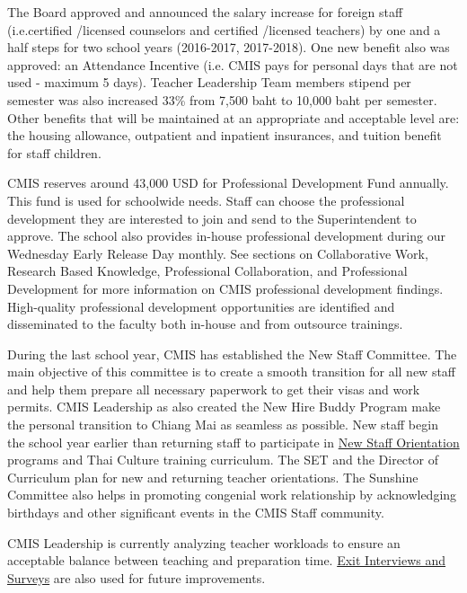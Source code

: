 \begin{findings}
The Board approved and announced the salary increase for foreign staff (i.e.certified /licensed counselors and certified /licensed teachers) by one and a half steps for two school years (2016-2017, 2017-2018). One new benefit also was approved: an Attendance Incentive (i.e. CMIS pays for personal days that are not used - maximum 5 days). Teacher Leadership Team members stipend per semester was also increased 33\% from 7,500 baht to  10,000 baht per semester. Other benefits that will be maintained at an appropriate and acceptable level are: the housing allowance, outpatient and inpatient insurances, and tuition benefit for staff children.


CMIS reserves around 43,000 USD for Professional Development Fund annually. This fund is used for schoolwide needs. Staff can choose the professional development they are interested to join and send to the Superintendent to approve. The school also provides in-house professional development during our Wednesday Early Release Day monthly. See sections on Collaborative Work, Research Based Knowledge, Professional Collaboration, and Professional Development for more information on CMIS professional development findings. High-quality professional development opportunities are identified and disseminated to the faculty both in-house and from outsource trainings. 


During the last school year, CMIS has established the New Staff Committee. The main objective of this committee is to create a smooth transition for all new staff and help them prepare all necessary paperwork to get their visas and work permits. CMIS Leadership as also created the New Hire Buddy Program make the personal transition to Chiang Mai as seamless as possible. New staff begin the school year earlier than returning staff to participate in \href{https://docs.google.com/document/d/1dN2nFzb_NHUekvrnmY0A3ttMZoVuJKn4iRhvfT4j6go/edit}{New Staff Orientation} programs and Thai Culture training curriculum.  The SET and the Director of Curriculum plan for new and returning teacher orientations. The Sunshine Committee also helps in promoting congenial work relationship by acknowledging birthdays and other significant events in the CMIS Staff community.  

CMIS Leadership is currently analyzing teacher workloads to ensure an acceptable balance between teaching and preparation time. \href{https://docs.google.com/document/d/18CUFZg0GClP-o7cAknyvsH9G6yivTofi1E_OwdvHHt4/edit}{Exit Interviews and Surveys} are also used for future improvements.
 

\end{findings}
